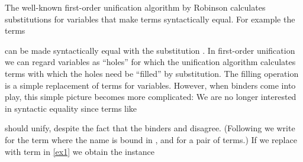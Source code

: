 \begin{isabellebody}\def\isabellecontext{Paper}\isadelimtheory
\endisadelimtheory
\isatagtheory
\endisatagtheory
{\isafoldtheory}\isadelimtheory
\endisadelimtheory
{}
\isamarkuptrue \begin{isamarkuptext}The well-known first-order unification algorithm by Robinson \cite{Robinson65} 
  calculates substitutions for variables that make terms syntactically equal. For 
  example the terms 

  \begin{center}
  \end{center}

  \noindent
  can be made syntactically equal with the substitution .  In first-order unification we can regard variables as
  ``holes'' for which the unification algorithm calculates terms with which
  the holes need be ``filled'' by substitution. The filling
  operation is a simple replacement of terms for variables.  However, when binders come
  into play, this simple picture becomes more complicated: We are no 
  longer interested in syntactic equality since terms like

  

  \noindent
  should unify, despite the fact that the binders  and 
  disagree. (Following \cite{UrbanPittsGabbay04} we write  for
  the term where the name  is bound in , and  
  for a pair of terms.) If we replace  
  with term  in \eqref{ex1} we obtain the instance


\end{isamarkuptext}
\end{isabellebody}
